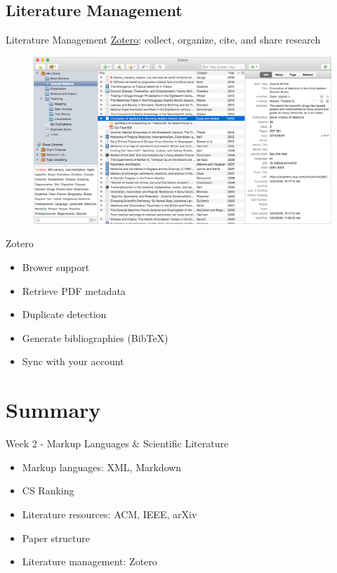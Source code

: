 \documentclass{../TexTemplate/myslide}
\begin{document}
\subsection{Literature Management}
\begin{frame}{Literature Management}
\href{https://www.zotero.org}{Zotero}: collect, organize, cite, and share research
\begin{figure}
\centering
\includegraphics[width=0.8\linewidth]{fig/zotero.png}
\end{figure}
\end{frame}

\begin{frame}{Zotero}
\begin{itemize}
	\item Brower support
	\item Retrieve PDF metadata
	\item Duplicate detection
	\item Generate bibliographies (Bib\TeX)
	\item Sync with your account
\end{itemize}
\end{frame}

\section{Summary}
\begin{frame}
\sectionpage
\end{frame}

\begin{frame}{Week 2 - Markup Languages \& Scientific Literature}
\begin{itemize}
	\item Markup languages: XML, Markdown
	\item CS Ranking
	\item Literature resources: ACM, IEEE, arXiv
	\item Paper structure
	\item Literature management: Zotero
\end{itemize}
\end{frame}
\end{document}
